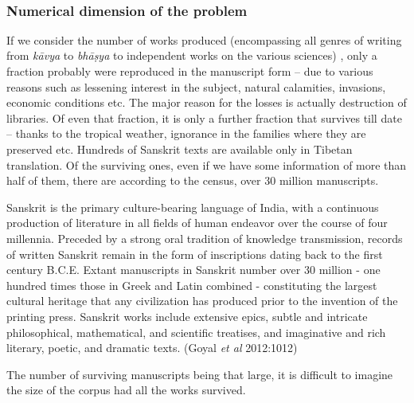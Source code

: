 ~\\[-40pt]

\subsubsection{Numerical dimension of the problem}
\vskip -5pt

{\leftskip=10pt\par}


If we consider the number of works produced (encompassing all genres of writing from {\sl kāvya} to {\sl bhāṣya} to independent works on the various sciences) , only a fraction probably were reproduced in the manuscript form – due to various reasons such as lessening interest in the subject, natural calamities, invasions, economic conditions etc. The major reason for the losses is actually destruction of libraries.  Of even that fraction, it is only a further fraction that survives till date – thanks to the tropical weather, ignorance in the families where they are preserved etc. Hundreds of Sanskrit texts are available only in Tibetan translation. Of the surviving ones, even if we have some information of more than half of them, there are according to the census, over 30 million manuscripts. 
\begin{myquote}
\eleven
Sanskrit is the primary culture-bearing language of India, with a continuous production of literature in all fields of human endeavor over the course of four millennia. Preceded by a strong oral tradition of knowledge transmission, records of written Sanskrit remain in the form of inscriptions dating back to the first century B.C.E. Extant manuscripts in Sanskrit number over 30 million - one hundred times those in Greek and Latin combined - constituting the largest cultural heritage that any civilization has produced prior to the invention of the printing press. Sanskrit works include extensive epics, subtle and intricate philosophical, mathematical, and scientific treatises, and imaginative and rich literary, poetic, and dramatic texts.	\hfill (Goyal {\sl et al} 2012:1012)
\end{myquote}

The number of surviving manuscripts being that large, it is difficult to imagine the size of the corpus had all the works survived. 

